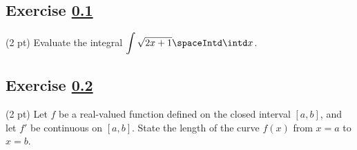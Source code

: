 \subsection{Exercise \ref{sec: Single Variable Calculus Q2}}
\label{sec: Single Variable Calculus Q2}

(2 pt) Evaluate the integral $\displaystyle\int \sqrt{2 x + 1} \spaceIntd \intd x$.




\subsection{Exercise \ref{sec: Single Variable Calculus Q3}}
\label{sec: Single Variable Calculus Q3}


(2 pt) Let $f$ be a real-valued function defined on the closed interval $[a,b]$, and let $f'$ be continuous on $[a,b]$. State the length of the curve $f(x)$ from $x = a$ to $x = b$.

